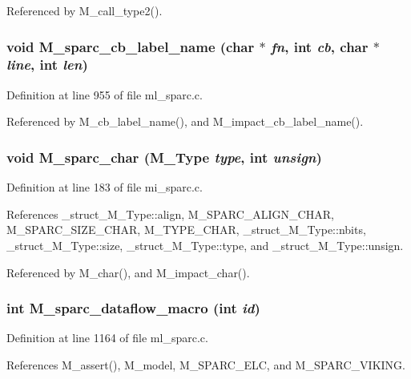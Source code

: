 Referenced by M\_\-call\_\-type2().
\subsubsection{\setlength{\rightskip}{0pt plus 5cm}void M\_\-sparc\_\-cb\_\-label\_\-name (char $\ast$ {\em fn}, int {\em cb}, char $\ast$ {\em line}, int {\em len})}\label{m__sparc_8h_0e0d71293d516c0e226739b8dcd27341}




Definition at line 955 of file ml\_\-sparc.c.

Referenced by M\_\-cb\_\-label\_\-name(), and M\_\-impact\_\-cb\_\-label\_\-name().
\subsubsection{\setlength{\rightskip}{0pt plus 5cm}void M\_\-sparc\_\-char (\bf{M\_\-Type} {\em type}, int {\em unsign})}\label{m__sparc_8h_c1019d13bd51f7d20727db1a7979ae89}




Definition at line 183 of file mi\_\-sparc.c.

References \_\-struct\_\-M\_\-Type::align, M\_\-SPARC\_\-ALIGN\_\-CHAR, M\_\-SPARC\_\-SIZE\_\-CHAR, M\_\-TYPE\_\-CHAR, \_\-struct\_\-M\_\-Type::nbits, \_\-struct\_\-M\_\-Type::size, \_\-struct\_\-M\_\-Type::type, and \_\-struct\_\-M\_\-Type::unsign.

Referenced by M\_\-char(), and M\_\-impact\_\-char().
\subsubsection{\setlength{\rightskip}{0pt plus 5cm}int M\_\-sparc\_\-dataflow\_\-macro (int {\em id})}\label{m__sparc_8h_88caba43c7f023b5c5ec4e5a2f842f3b}




Definition at line 1164 of file ml\_\-sparc.c.

References M\_\-assert(), M\_\-model, M\_\-SPARC\_\-ELC, and M\_\-SPARC\_\-VIKING.

